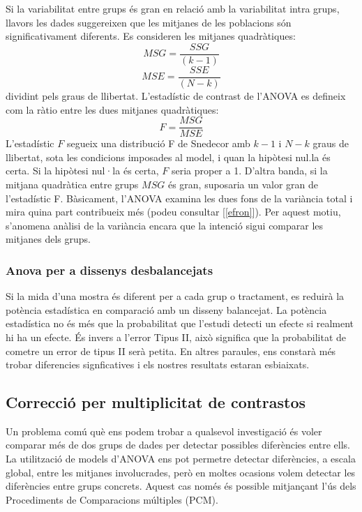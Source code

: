 \documentclass[english]{article}
\begin{document}
Si la variabilitat entre grups és gran en relació amb la variabilitat intra grups, llavors les dades suggereixen que les mitjanes de les poblacions són significativament diferents. Es consideren les mitjanes quadràtiques:
\begin{equation*}
MSG = \frac{SSG}{(k-1)}
\end{equation*}
\begin{equation*}
MSE = \frac{SSE}{(N-k)}
\end{equation*}
dividint pels graus de llibertat. L'estadístic de contrast de l'ANOVA es defineix com la ràtio entre les dues mitjanes quadràtiques:
\begin{equation*}
F = \frac{MSG}{MSE}
\end{equation*}
L'estadístic $F$ segueix una distribució F de Snedecor amb $k-1$ i $N-k$ graus de llibertat, sota les condicions imposades al model, i quan la hipòtesi nul.la és certa. Si la hipòtesi nul·la és certa, $F$ seria proper a 1. D'altra banda, si la mitjana quadràtica entre grups $MSG$ és gran, suposaria un valor gran de l'estadístic F. Bàsicament, l'ANOVA examina les dues fons de la variància total i mira quina part contribueix més (podeu consultar [\ref{efron}]). Per aquest motiu, s'anomena anàlisi de la variància encara que la intenció sigui comparar les mitjanes dels grups.
\\

\subsubsection{Anova per a dissenys desbalancejats}
Si la mida d'una mostra és diferent per a cada grup o tractament, es reduirà la potència estadística en comparació amb un disseny balancejat. La potència estadística no és més que la probabilitat que l'estudi detecti un efecte si realment hi ha un efecte. És invers a l'error Tipus II, això significa que la probabilitat de cometre un error de tipus II serà petita. En altres paraules, ens constarà més trobar diferencies signficatives i els nostres resultats estaran esbiaixats.
\clearpage
\subsection{Correcció per multiplicitat de contrastos}
\label{2.2}
Un problema comú què ens podem trobar a qualsevol investigació és voler comparar més de dos grups de dades per detectar possibles diferències entre ells. La utilització de models d'ANOVA ens pot permetre detectar diferències, a escala global, entre les mitjanes involucrades, però en moltes ocasions volem detectar les diferències entre grups concrets. Aquest cas només és possible mitjançant l'ús dels Procediments de Comparacions múltiples (PCM).
\\
\end{document}
